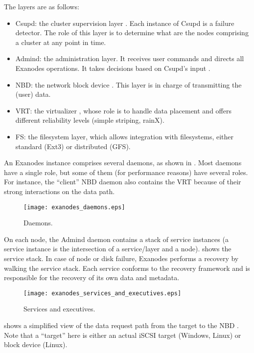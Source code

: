 \documentclass[a4paper,12pt,twoside]{report}
\begin{document}
The layers are as follows:
\begin{itemize}
\item Csupd: the cluster supervision layer \cite{csupd, mship}. Each
  instance of Csupd is a failure detector. The role of this layer is
  to determine what are the nodes comprising a cluster at any point in
  time.
\item Admind: the administration layer. It receives user commands
  \cite{cli_server} and directs all Exanodes operations. It takes
  decisions based on Csupd's input \cite{evmgr, mship}.
\item NBD: the network block device \cite{nbd}. This layer is in charge of
  transmitting the (user) data.
\item VRT: the virtualizer \cite{vrt}, whose role is to handle data
  placement and offers different reliability levels (simple striping,
  rainX).
\item FS: the filesystem layer, which allows integration with
  filesystems, either standard (Ext3) or distributed (GFS).
\end{itemize}

An Exanodes instance comprises several daemons, as shown in
. Most daemons have a single role, but some of
them (for performance reasons) have several roles. For instance, the
``client'' NBD daemon also contains the VRT because of their strong
interactions on the data path.

\begin{figure}[ht]
  \centering
  \texttt{[image: exanodes\_daemons.eps]}
  \caption{\label{fig:daemons}Daemons.}
\end{figure}

On each node, the Admind daemon contains a stack of service instances
(a service instance is the intersection of a service/layer and a
node).  shows the service
stack. In case of node or disk failure, Exanodes performs a recovery
by walking the service stack. Each service conforms to the recovery
framework and is responsible for the recovery of its own data and
metadata.

\begin{figure}[ht]
  \centering
  \texttt{[image: exanodes\_services\_and\_executives.eps]}
  \caption{\label{fig:services_and_executives}Services and executives.}
\end{figure}

 shows a simplified view of the data
request path from the target to the NBD \cite{request_path}. Note that
a ``target'' here is either an actual iSCSI target (Windows, Linux) or block
device (Linux).
\end{document}
